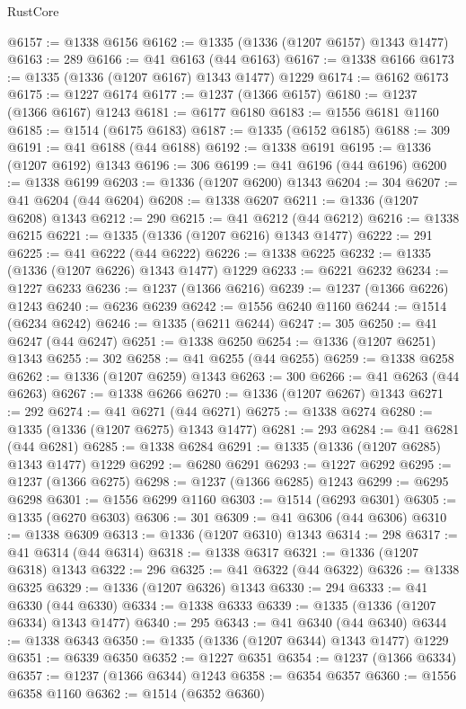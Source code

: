 \begin{lexlean}{RustCore}
\begin{coremodule}
@6157 := @1338 @6156
@6162 := @1335 (@1336 (@1207 @6157) @1343 @1477)
@6163 := 289
@6166 := @41 @6163 (@44 @6163)
@6167 := @1338 @6166
@6173 := @1335 (@1336 (@1207 @6167) @1343 @1477) @1229
@6174 := @6162 @6173
@6175 := @1227 @6174
@6177 := @1237 (@1366 @6157)
@6180 := @1237 (@1366 @6167) @1243
@6181 := @6177 @6180
@6183 := @1556 @6181 @1160
@6185 := @1514 (@6175 @6183)
@6187 := @1335 (@6152 @6185)
@6188 := 309
@6191 := @41 @6188 (@44 @6188)
@6192 := @1338 @6191
@6195 := @1336 (@1207 @6192) @1343
@6196 := 306
@6199 := @41 @6196 (@44 @6196)
@6200 := @1338 @6199
@6203 := @1336 (@1207 @6200) @1343
@6204 := 304
@6207 := @41 @6204 (@44 @6204)
@6208 := @1338 @6207
@6211 := @1336 (@1207 @6208) @1343
@6212 := 290
@6215 := @41 @6212 (@44 @6212)
@6216 := @1338 @6215
@6221 := @1335 (@1336 (@1207 @6216) @1343 @1477)
@6222 := 291
@6225 := @41 @6222 (@44 @6222)
@6226 := @1338 @6225
@6232 := @1335 (@1336 (@1207 @6226) @1343 @1477) @1229
@6233 := @6221 @6232
@6234 := @1227 @6233
@6236 := @1237 (@1366 @6216)
@6239 := @1237 (@1366 @6226) @1243
@6240 := @6236 @6239
@6242 := @1556 @6240 @1160
@6244 := @1514 (@6234 @6242)
@6246 := @1335 (@6211 @6244)
@6247 := 305
@6250 := @41 @6247 (@44 @6247)
@6251 := @1338 @6250
@6254 := @1336 (@1207 @6251) @1343
@6255 := 302
@6258 := @41 @6255 (@44 @6255)
@6259 := @1338 @6258
@6262 := @1336 (@1207 @6259) @1343
@6263 := 300
@6266 := @41 @6263 (@44 @6263)
@6267 := @1338 @6266
@6270 := @1336 (@1207 @6267) @1343
@6271 := 292
@6274 := @41 @6271 (@44 @6271)
@6275 := @1338 @6274
@6280 := @1335 (@1336 (@1207 @6275) @1343 @1477)
@6281 := 293
@6284 := @41 @6281 (@44 @6281)
@6285 := @1338 @6284
@6291 := @1335 (@1336 (@1207 @6285) @1343 @1477) @1229
@6292 := @6280 @6291
@6293 := @1227 @6292
@6295 := @1237 (@1366 @6275)
@6298 := @1237 (@1366 @6285) @1243
@6299 := @6295 @6298
@6301 := @1556 @6299 @1160
@6303 := @1514 (@6293 @6301)
@6305 := @1335 (@6270 @6303)
@6306 := 301
@6309 := @41 @6306 (@44 @6306)
@6310 := @1338 @6309
@6313 := @1336 (@1207 @6310) @1343
@6314 := 298
@6317 := @41 @6314 (@44 @6314)
@6318 := @1338 @6317
@6321 := @1336 (@1207 @6318) @1343
@6322 := 296
@6325 := @41 @6322 (@44 @6322)
@6326 := @1338 @6325
@6329 := @1336 (@1207 @6326) @1343
@6330 := 294
@6333 := @41 @6330 (@44 @6330)
@6334 := @1338 @6333
@6339 := @1335 (@1336 (@1207 @6334) @1343 @1477)
@6340 := 295
@6343 := @41 @6340 (@44 @6340)
@6344 := @1338 @6343
@6350 := @1335 (@1336 (@1207 @6344) @1343 @1477) @1229
@6351 := @6339 @6350
@6352 := @1227 @6351
@6354 := @1237 (@1366 @6334)
@6357 := @1237 (@1366 @6344) @1243
@6358 := @6354 @6357
@6360 := @1556 @6358 @1160
@6362 := @1514 (@6352 @6360)

\end{coremodule}
\end{lexlean}
